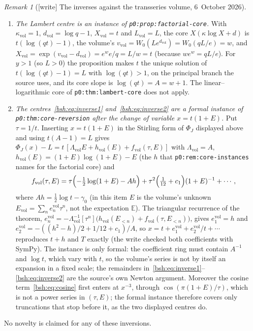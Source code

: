 \documentclass[11pt,letterpaper]{article}
\theoremstyle{remark}\newtheorem{remark}[theorem]{Remark}
\newcommand{\E}{\mathbb E}
\newcommand{\file}[1]{\nolinkurl{#1}}
\begin{document}
\begin{remark}[{[write]} The inverses against the transseries volume, 6~October 2026]
\begin{enumerate}[label=(\alph*)]
 code). This is Question~\ref{bsh:q:branch} of
 Section~\ref{bsh:sec:sources}.
\item \emph{The Lambert centre is an instance of
 \file{p0:prop:factorial-core}.} With $\kappa_{\mathrm{vol}}=1$,
 $d_{\mathrm{vol}}=\log q-1$, $X_{\mathrm{vol}}=t$ and $L_{\mathrm{vol}}=L$,
 the core $X(\kappa\log X+d)$ is $t(\log(qt)-1)$, the volume's
 $v_{\mathrm{vol}}=W_0(Le^{d_{\mathrm{vol}}})=W_0(qL/e)=w$, and
 $X_{\mathrm{vol}}=\exp(v_{\mathrm{vol}}-d_{\mathrm{vol}})=e^{w}e/q=L/w=t$
 (because $we^w=qL/e$). For $y>1$ (so $L>0$) the proposition makes $t$ the
 unique solution of $t(\log(qt)-1)=L$ with $\log(qt)>1$, on the principal
 branch the source uses, and its core slope is $\log(qt)=A=w+1$. The
 linear--logarithmic core of \file{p0:thm:lambert-core} does not apply.
\item \emph{The centres~\eqref{bsh:eq:inverse1}
 and~\eqref{bsh:eq:inverse2} are a formal instance of
 \file{p0:thm:core-reversion} after the change of variable $x=t(1+E)$.}
 Put $\tau=1/t$. Inserting $x=t(1+E)$ in the Stirling form of $\Phi_J$
 displayed above and using $t(A-1)=L$ gives
 $\Phi_J(x)-L=t\,[\Lambda_{\mathrm{vol}}E+h_{\mathrm{vol}}(E)+f_{\mathrm{vol}}(\tau,E)]$
 with $\Lambda_{\mathrm{vol}}=A$,
 $h_{\mathrm{vol}}(E)=(1+E)\log(1+E)-E$ (the $h$ that
 \file{p0:rem:core-instances} names for the factorial core) and
 \[
  f_{\mathrm{vol}}(\tau,E)=\tau\Bigl(-\tfrac12\log(1+E)-Ah\Bigr)
   +\tau^2\Bigl(\tfrac1{12}+c_1\Bigr)(1+E)^{-1}+\cdots,
 \]
 where $Ah=\frac12\log t-\gamma_0$ (in this item $E$ is the volume's
 unknown $E_{\mathrm{vol}}=\sum_ne^{\mathrm{vol}}_n\tau^n$, not the
 expectation $\E$). The triangular recurrence of the theorem,
 $e^{\mathrm{vol}}_n=-\Lambda_{\mathrm{vol}}^{-1}[\tau^n]\bigl(h_{\mathrm{vol}}(E_{<n})+f_{\mathrm{vol}}(\tau,E_{<n})\bigr)$,
 gives $e^{\mathrm{vol}}_1=h$ and
 $e^{\mathrm{vol}}_2=-((h^2-h)/2+1/12+c_1)/A$, so
 $x=t+e^{\mathrm{vol}}_1+e^{\mathrm{vol}}_2/t+\cdots$ reproduces $t+h$ and
 $T$ exactly (the write checked
 both coefficients with SymPy). The instance is only formal: the
 coefficient ring must contain $A^{-1}$ and $\log t$, which vary with $t$,
 so the volume's series is not by itself an expansion in a fixed scale; the
 remainders in~\eqref{bsh:eq:inverse1}--\eqref{bsh:eq:inverse2} are the
 source's own Newton argument. Moreover the cosine
 term~\eqref{bsh:eq:cosine} first enters at $x^{-3}$, through
 $\cos(\pi(1+E)/\tau)$, which is not a power series in $(\tau,E)$; the
 formal instance therefore covers only truncations that stop before it, as
 the two displayed centres do.
\end{enumerate}
No novelty is claimed for any of these inversions.
\end{remark}
\end{document}

